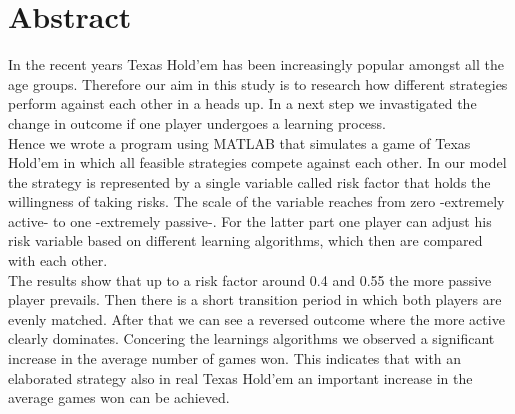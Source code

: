 \documentclass[11pt]{article}
\begin{document}



\tableofcontents

\newpage




\section{Abstract}






In the recent years Texas Hold'em has been increasingly popular amongst all the age groups. Therefore our aim in this study is to research how different strategies perform against each other in a heads up. In a next step we invastigated the change in outcome if one player undergoes a learning process. \\
Hence we wrote a program using MATLAB that simulates a game of Texas Hold'em in which all feasible strategies compete against each other. In our model the strategy is represented by a single variable called risk factor that holds the willingness of taking risks. The scale of the variable reaches from zero -extremely active- to one -extremely passive-. For the latter part one player can adjust his risk variable based on different learning algorithms, which then are compared with each other.\\
The results show that up to a risk factor around 0.4 and 0.55 the more passive player prevails. Then there is a short transition period in which both players are evenly matched. After that we can see a reversed outcome where the more active clearly dominates. Concering the learnings algorithms we observed a significant increase in the average number of games won. This indicates that with an elaborated strategy also in real Texas Hold'em an important increase in the average games won can be achieved.
\end{document}
